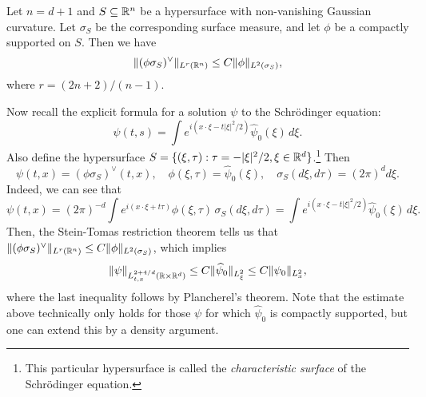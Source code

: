 \begin{theorem}
  Let $n = d + 1$ and $S \subseteq \mathbb{R}^n$ be a
  hypersurface with non-vanishing Gaussian curvature.
  Let $\sigma_S$ be the corresponding surface measure,
  and let $\phi$ be a compactly supported  on $S$.
  Then we have
  \[
    \|(\phi \sigma_S)^\vee\|_{L^r(\mathbb{R}^n)} \le
    C \|\phi\|_{L^2(\sigma_S)},
  \]
  where $r = (2n + 2) / (n - 1)$.
\end{theorem}

\begin{remark}
  Now recall the explicit formula for a solution $\psi$
  to the Schr\"odinger equation:
  \[
    \psi(t, s) = \int e^{i(x \cdot \xi - t |\xi|^2 / 2)} \widehat{\psi}_0(\xi)\, d\xi.
  \]
  Also define the hypersurface
  $S = \{(\xi, \tau) : \tau = -|\xi|^2 / 2, \xi \in \mathbb{R}^d\}$.\footnote{This particular hypersurface is called the \emph{characteristic surface} of the Schr\"odinger equation.}
  Then
  \[
    \psi(t, x) = (\phi \sigma_S)^\vee (t, x), \quad
    \phi(\xi, \tau) = \widehat{\psi}_0(\xi), \quad
    \sigma_S(d \xi, d \tau) = (2 \pi)^d d\xi.
  \]
  Indeed, we can see that
  \[
    \psi(t, x) = (2\pi)^{-d} \int e^{i(x \cdot \xi + t \tau)} \phi(\xi, \tau)\, \sigma_S(d \xi, d \tau)
    = \int e^{i(x \cdot \xi - t |\xi|^2 / 2)} \widehat{\psi}_0(\xi)\, d\xi.
  \]
  Then, the Stein-Tomas restriction theorem tells us
  that
  $\|(\phi \sigma_S)^\vee\|_{L^r(\mathbb{R}^n)} \le C \|\phi\|_{L^2(\sigma_S)}$,
  which implies
  \[
    \|\psi\|_{L^{2 + 4 / d}_{t, x}(\mathbb{R} \times \mathbb{R}^d)}
    \le C \|\widehat{\psi}_0\|_{L^2_\xi}
    \le C \|\psi_0\|_{L^2_x},
  \]
  where the last inequality follows by
  Plancherel's theorem. Note that the estimate
  above technically only holds for those $\psi$
  for which $\widehat{\psi}_0$ is compactly supported,
  but one can extend this by a density argument.
\end{remark}
